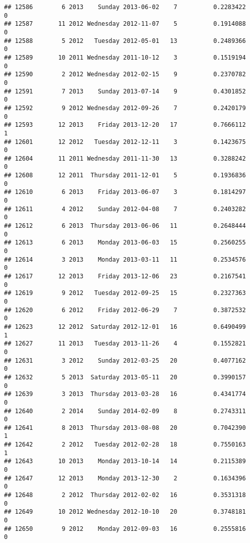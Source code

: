 \documentclass[
]{article}
\begin{document}
\begin{verbatim}
## 12586        6 2013    Sunday 2013-06-02    7          0.2283422             0
## 12587       11 2012 Wednesday 2012-11-07    5          0.1914088             0
## 12588        5 2012   Tuesday 2012-05-01   13          0.2489366             0
## 12589       10 2011 Wednesday 2011-10-12    3          0.1519194             0
## 12590        2 2012 Wednesday 2012-02-15    9          0.2370782             0
## 12591        7 2013    Sunday 2013-07-14    9          0.4301852             0
## 12592        9 2012 Wednesday 2012-09-26    7          0.2420179             0
## 12593       12 2013    Friday 2013-12-20   17          0.7666112             1
## 12601       12 2012   Tuesday 2012-12-11    3          0.1423675             0
## 12604       11 2011 Wednesday 2011-11-30   13          0.3288242             0
## 12608       12 2011  Thursday 2011-12-01    5          0.1936836             0
## 12610        6 2013    Friday 2013-06-07    3          0.1814297             0
## 12611        4 2012    Sunday 2012-04-08    7          0.2403282             0
## 12612        6 2013  Thursday 2013-06-06   11          0.2648444             0
## 12613        6 2013    Monday 2013-06-03   15          0.2560255             0
## 12614        3 2013    Monday 2013-03-11   11          0.2534576             0
## 12617       12 2013    Friday 2013-12-06   23          0.2167541             0
## 12619        9 2012   Tuesday 2012-09-25   15          0.2327363             0
## 12620        6 2012    Friday 2012-06-29    7          0.3872532             0
## 12623       12 2012  Saturday 2012-12-01   16          0.6490499             1
## 12627       11 2013   Tuesday 2013-11-26    4          0.1552821             0
## 12631        3 2012    Sunday 2012-03-25   20          0.4077162             0
## 12632        5 2013  Saturday 2013-05-11   20          0.3990157             0
## 12639        3 2013  Thursday 2013-03-28   16          0.4341774             0
## 12640        2 2014    Sunday 2014-02-09    8          0.2743311             0
## 12641        8 2013  Thursday 2013-08-08   20          0.7042390             1
## 12642        2 2012   Tuesday 2012-02-28   18          0.7550163             1
## 12643       10 2013    Monday 2013-10-14   14          0.2115389             0
## 12647       12 2013    Monday 2013-12-30    2          0.1634396             0
## 12648        2 2012  Thursday 2012-02-02   16          0.3531318             0
## 12649       10 2012 Wednesday 2012-10-10   20          0.3748181             0
## 12650        9 2012    Monday 2012-09-03   16          0.2555816             0

\end{verbatim}
\end{document}
